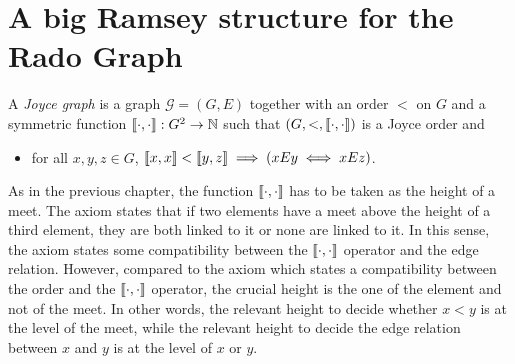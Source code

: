 \section{A big Ramsey structure for the Rado Graph}
\begin{definition}
  A \emph{Joyce graph} is a graph $\mathcal{G} = (G,E)$ together with an order $<$ on $G$ and a symmetric function $\llbracket \cdot , \cdot \rrbracket:G^2\to\mathbb{N}$ such that $(G,<,\llbracket \cdot , \cdot \rrbracket)$ is a Joyce order and
  \begin{itemize}
  \item[\Jo4] for all $x,y,z\in G$, $\llbracket x , x \rrbracket < \llbracket y , z \rrbracket \implies (xEy\iff xEz)$.
  \end{itemize}
\end{definition}

As in the previous chapter, the function $\llbracket \cdot , \cdot \rrbracket$ has to be taken as the height of a meet. The axiom  states that if two elements have a meet above the height of a third element, they are both linked to it or none are linked to it. In this sense, the axiom states some compatibility between the $\llbracket \cdot , \cdot \rrbracket$ operator and the edge relation. However, compared to the axiom  which states a compatibility between the order and the $\llbracket \cdot , \cdot \rrbracket$ operator, the crucial height is the one of the element and not of the meet. In other words, the relevant height to decide whether $x<y$ is at the level of the meet, while the relevant height to decide the edge relation between $x$ and $y$ is at the level of $x$ or $y$.



